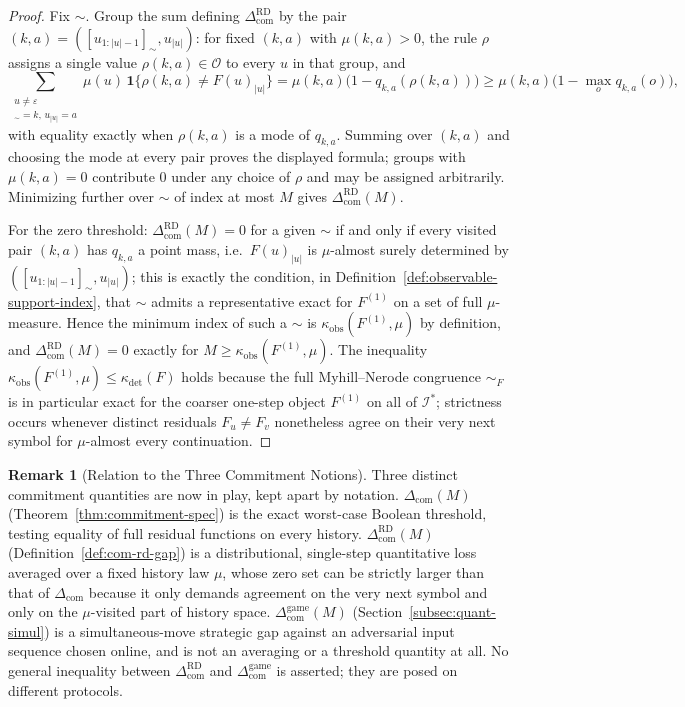 \documentclass[12pt]{article}
\theoremstyle{definition}
\newtheorem{remark}[theorem]{Remark}
\newcommand{\Com}{\Delta_{\mathrm{com}}}
\newcommand{\Comex}{\Com}
\newcommand{\ComRD}{\Delta_{\mathrm{com}}^{\mathrm{RD}}}
\newcommand{\ComGame}{\Delta_{\mathrm{com}}^{\mathrm{game}}}
\begin{document}
\begin{proof}
Fix $\sim$.  Group the sum defining $\ComRD$ by the pair
$(k,a)=([u_{1:|u|-1}]_\sim,u_{|u|})$: for fixed $(k,a)$ with $\mu(k,a)>0$, the
rule $\rho$ assigns a single value $\rho(k,a)\in\mathcal O$ to every $u$ in
that group, and
\[
\sum_{\substack{u\ne\varepsilon\\ [u_{1:|u|-1}]_\sim=k,\,u_{|u|}=a}}
\mu(u)\,\mathbf 1\{\rho(k,a)\ne F(u)_{|u|}\}
=
\mu(k,a)\bigl(1-q_{k,a}(\rho(k,a))\bigr)
\ge
\mu(k,a)\bigl(1-\max_oq_{k,a}(o)\bigr),
\]
with equality exactly when $\rho(k,a)$ is a mode of $q_{k,a}$.  Summing over
$(k,a)$ and choosing the mode at every pair proves the displayed formula;
groups with $\mu(k,a)=0$ contribute $0$ under any choice of $\rho$ and may be
assigned arbitrarily.  Minimizing further over $\sim$ of index at most $M$
gives $\ComRD(M)$.

For the zero threshold: $\ComRD(M)=0$ for a given $\sim$ if and only if every
visited pair $(k,a)$ has $q_{k,a}$ a point mass, i.e.\ $F(u)_{|u|}$ is
$\mu$-almost surely determined by $([u_{1:|u|-1}]_\sim,u_{|u|})$; this is
exactly the condition, in Definition~\ref{def:observable-support-index}, that
$\sim$ admits a representative exact for $F^{(1)}$ on a set of full
$\mu$-measure.  Hence the minimum index of such a $\sim$ is
$\kappa_{\mathrm{obs}}(F^{(1)},\mu)$ by definition, and $\ComRD(M)=0$ exactly
for $M\ge\kappa_{\mathrm{obs}}(F^{(1)},\mu)$.  The inequality
$\kappa_{\mathrm{obs}}(F^{(1)},\mu)\le\kappa_{\det}(F)$ holds because the full
Myhill--Nerode congruence $\sim_F$ is in particular exact for the coarser
one-step object $F^{(1)}$ on all of $\mathcal I^*$; strictness occurs
whenever distinct residuals $F_u\ne F_v$ nonetheless agree on their very next
symbol for $\mu$-almost every continuation.
\end{proof}

\begin{remark}[Relation to the Three Commitment Notions]
\label{rem:com-rd-scope}
Three distinct commitment quantities are now in play, kept apart by
notation. $\Comex(M)$ (Theorem~\ref{thm:commitment-spec}) is the exact
worst-case Boolean threshold, testing equality of full residual functions on
every history.  $\ComRD(M)$ (Definition~\ref{def:com-rd-gap}) is a
distributional, single-step quantitative loss averaged over a fixed history
law $\mu$, whose zero set can be strictly larger than that of $\Comex$
because it only demands agreement on the very next symbol and only on the
$\mu$-visited part of history space.  $\ComGame(M)$
(Section~\ref{subsec:quant-simul}) is a simultaneous-move strategic gap
against an adversarial input sequence chosen online, and is not an averaging
or a threshold quantity at all.  No general inequality between $\ComRD$ and
$\ComGame$ is asserted; they are posed on different protocols.
\end{remark}
\end{document}
